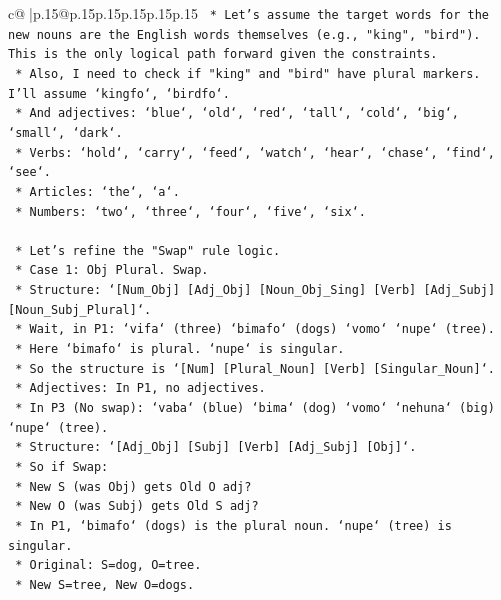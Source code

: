 \documentclass{article}
\begin{document}
{\begin{supertabular}{c@{$\;$}|p{.15\linewidth}@{}p{.15\linewidth}p{.15\linewidth}p{.15\linewidth}p{.15\linewidth}p{.15\linewidth}}
{{{\texttt{    *   Let's assume the target words for the new nouns are the English words themselves (e.g., "king", "bird"). This is the only logical path forward given the constraints.} \\
\texttt{    *   Also, I need to check if "king" and "bird" have plural markers. I'll assume `kingfo`, `birdfo`.} \\
\texttt{    *   And adjectives: `blue`, `old`, `red`, `tall`, `cold`, `big`, `small`, `dark`.} \\
\texttt{    *   Verbs: `hold`, `carry`, `feed`, `watch`, `hear`, `chase`, `find`, `see`.} \\
\texttt{    *   Articles: `the`, `a`.} \\
\texttt{    *   Numbers: `two`, `three`, `four`, `five`, `six`.} \\
\\ 
\texttt{    *   Let's refine the "Swap" rule logic.} \\
\texttt{        *   Case 1: Obj Plural. Swap.} \\
\texttt{            *   Structure: `{[}Num\_Obj{]} {[}Adj\_Obj{]} {[}Noun\_Obj\_Sing{]} {[}Verb{]} {[}Adj\_Subj{]} {[}Noun\_Subj\_Plural{]}`.} \\
\texttt{            *   Wait, in P1: `vifa` (three) `bimafo` (dogs) `vomo` `nupe` (tree).} \\
\texttt{            *   Here `bimafo` is plural. `nupe` is singular.} \\
\texttt{            *   So the structure is `{[}Num{]} {[}Plural\_Noun{]} {[}Verb{]} {[}Singular\_Noun{]}`.} \\
\texttt{            *   Adjectives: In P1, no adjectives.} \\
\texttt{            *   In P3 (No swap): `vaba` (blue) `bima` (dog) `vomo` `nehuna` (big) `nupe` (tree).} \\
\texttt{            *   Structure: `{[}Adj\_Obj{]} {[}Subj{]} {[}Verb{]} {[}Adj\_Subj{]} {[}Obj{]}`.} \\
\texttt{            *   So if Swap:} \\
\texttt{                *   New S (was Obj) gets Old O adj?} \\
\texttt{                *   New O (was Subj) gets Old S adj?} \\
\texttt{                *   In P1, `bimafo` (dogs) is the plural noun. `nupe` (tree) is singular.} \\
\texttt{                *   Original: S=dog, O=tree.} \\
\texttt{                *   New S=tree, New O=dogs.} \\
}}}
\end{supertabular}}
\end{document}
